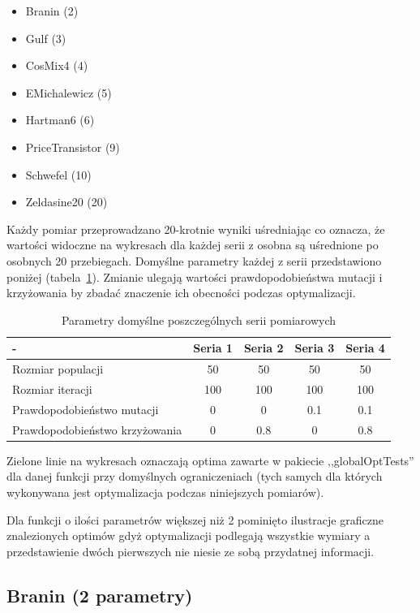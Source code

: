\documentclass[11pt, a4paper]{article}
\newcommand{\fbi}{\leavevmode{\parindent=1em\indent}}
\begin{document}
\begin{itemize}
	\item Branin (2)
	\item Gulf (3)
	\item CosMix4 (4)
	\item EMichalewicz (5)
	\item Hartman6 (6)
	\item PriceTransistor (9)
	\item Schwefel (10)
	\item Zeldasine20 (20)
\end{itemize}

\fbi
Każdy pomiar przeprowadzano 20-krotnie wyniki uśredniając co oznacza, że wartości widoczne na wykresach dla każdej serii z osobna są uśrednione po osobnych 20 przebiegach. Domyślne parametry każdej z serii przedstawiono poniżej (tabela~\ref{tab:parametry}). Zmianie ulegają wartości  prawdopodobieństwa mutacji i krzyżowania by zbadać znaczenie ich obecności podczas optymalizacji.

\begin{table}[htbp]
	\centering
	\caption{Parametry domyślne poszczególnych serii pomiarowych}
	\label{tab:parametry}
	\begin{tabularx}{\textwidth}{|X|c|c|c|c|}
		\hline
		- & Seria 1 & Seria 2 & Seria 3 & Seria 4\\ 
		\hline
		Rozmiar populacji & 50 & 50 & 50 & 50 \\ 
		\hline 
		Rozmiar iteracji & 100 & 100 & 100 & 100 \\ 
		\hline 
		Prawdopodobieństwo mutacji & 0 & 0 & 0.1 & 0.1 \\ 
		\hline 
		Prawdopodobieństwo krzyżowania & 0 & 0.8 & 0 & 0.8 \\ 
		\hline 
	\end{tabularx} 
\end{table}

\fbi
Zielone linie na wykresach oznaczają optima zawarte w pakiecie ,,globalOptTests'' dla danej funkcji przy domyślnych ograniczeniach (tych samych dla których wykonywana jest optymalizacja podczas niniejszych pomiarów).

\fbi
Dla funkcji o ilości parametrów większej niż 2 pominięto ilustracje graficzne znalezionych optimów gdyż optymalizacji podlegają wszystkie wymiary a przedstawienie dwóch pierwszych nie niesie ze sobą przydatnej informacji.

\newpage
\subsection{Branin (2 parametry)}
\end{document}
